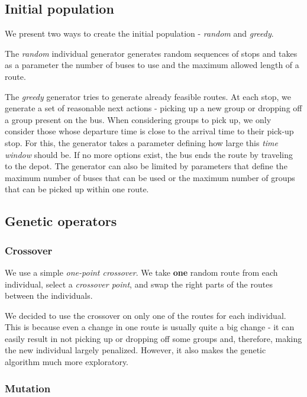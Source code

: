 \subsection{Initial population}

We present two ways to create the initial population - \textit{random} and \textit{greedy}.

The \textit{random} individual generator generates random sequences of stops and takes as a parameter the number of buses to use and the maximum allowed length of a route.

The \textit{greedy} generator tries to generate already feasible routes. At each stop, we generate a set of reasonable next actions - picking up a new group or dropping off a group present on the bus. When considering groups to pick up, we only consider those whose departure time is close to the arrival time to their pick-up stop. For this, the generator takes a parameter defining how large this \textit{time window} should be. If no more options exist, the bus ends the route by traveling to the depot. The generator can also be limited by parameters that define the maximum number of buses that can be used or the maximum number of groups that can be picked up within one route.

\subsection{Genetic operators}

\subsubsection{Crossover}

We use a simple \textit{one-point crossover}. We take \textbf{one} random route from each individual, select a \textit{crossover point}, and swap the right parts of the routes between the individuals.

We decided to use the crossover on only one of the routes for each individual. This is because even a change in one route is usually quite a big change - it can easily result in not picking up or dropping off some groups and, therefore, making the new individual largely penalized. However, it also makes the genetic algorithm much more exploratory.

\subsubsection{Mutation}


